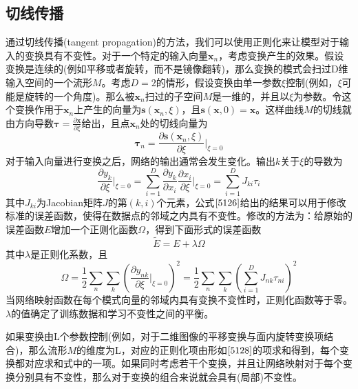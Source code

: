 \subsection*{切线传播}
通过切线传播(tangent propagation)的方法，我们可以使用正则化来让模型对于输入的变换具有不变性。对于一个特定的输入向量$\boldsymbol{x}_n$，考虑变换产生的效果。假设变换是连续的(例如平移或者旋转，而不是镜像翻转)，那么变换的模式会扫过D维输入空间的一个流形$M$。考虑$D=2$的情形，假设变换由单一参数$\xi$控制(例如，$\xi$可能是旋转的一个角度)。那么被$\boldsymbol{x}_n$扫过的子空间$M$是一维的，并且以$\xi$为参数。令这个变换作用于$\boldsymbol{x}_n$上产生的向量为$\boldsymbol{s}(\boldsymbol{x}_n,\xi)$，且$\boldsymbol{s}(\boldsymbol{x},0)=\boldsymbol{x}$。这样曲线$M$的切线就由方向导数$\boldsymbol{\tau}=\frac{\partial \boldsymbol{x}}{\partial \xi}$给出，且点$\boldsymbol{x}_n$处的切线向量为
\begin{equation}
	\boldsymbol{\tau}_n=\frac{\partial \boldsymbol{s}(\boldsymbol{x}_n,\xi)}{\partial \xi}\Bigg|_{\xi=0}
\end{equation}
对于输入向量进行变换之后，网络的输出通常会发生变化。输出$k$关于$\xi$的导数为
\begin{equation}
\label{5126}
	\frac{\partial y_k}{\partial \xi}\Bigg|_{\xi=0}=\sum_{i=1}^{D}\frac{\partial y_k}{\partial x_i}\frac{\partial x_i}{\partial \xi}\Bigg|_{\xi=0}=\sum_{i=1}^{D}J_{ki}\tau_i
\end{equation}
其中$J_{ki}$为Jacobian矩阵$J$的第$(k,i)$个元素，公式$\ref{5126}$给出的结果可以用于修改标准的误差函数，使得在数据点的邻域之内具有不变性。修改的方法为：给原始的误差函数$E$增加一个正则化函数$\Omega$，得到下面形式的误差函数
\begin{equation}
	\tilde{E}=E+\lambda\Omega
\end{equation}
其中$\lambda$是正则化系数，且
\begin{equation}
\label{5128}
	\Omega=\frac{1}{2}\sum_n\sum_k\left(\frac{\partial y_{nk}}{\partial \xi}\Bigg|_{\xi=0} \right)^2=\frac{1}{2}\sum_n\sum_k\left(\sum_{i=1}^{D}J_{nk}\tau_{ni}\right)^2
\end{equation}
当网络映射函数在每个模式向量的邻域内具有变换不变性时，正则化函数等于零。$\lambda$的值确定了训练数据和学习不变性之间的平衡。

如果变换由L个参数控制(例如，对于二维图像的平移变换与面内旋转变换项结合)，那么流形$M$的维度为L，对应的正则化项由形如$\ref{5128}$的项求和得到，每个变换都对应求和式中的一项。如果同时考虑若干个变换，并且让网络映射对于每个变换分别具有不变性，那么对于变换的组合来说就会具有(局部)不变性。

